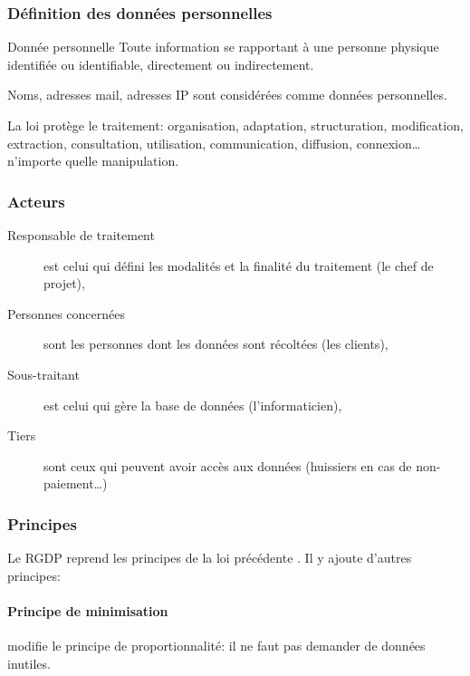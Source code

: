 \documentclass[10pt,a4paper,french]{article}
\begin{document}
\subsubsection{Définition des données personnelles}

\begin{cquote}{Donnée personnelle}
Toute information se rapportant à une personne physique identifiée ou identifiable, directement ou indirectement.
\end{cquote}

Noms, adresses mail, adresses IP sont considérées comme données personnelles.

La loi protège le traitement: organisation, adaptation, structuration, modification, extraction, consultation, utilisation, communication, diffusion, connexion\ldots n'importe quelle manipulation.

\subsubsection{Acteurs}

\begin{description}
\item[Responsable de traitement] est celui qui défini les modalités et la finalité du traitement (le chef de projet),
\item[Personnes concernées] sont les personnes dont les données sont récoltées (les clients),
\item[Sous-traitant] est celui qui gère la base de données (l'informaticien),
\item[Tiers] sont ceux qui peuvent avoir accès aux données (huissiers en cas de non-paiement\ldots)
\end{description}

\subsubsection{Principes}

Le RGDP reprend les principes de la loi précédente . Il y ajoute d'autres principes:

\paragraph{Principe de minimisation}
modifie le principe de proportionnalité: il ne faut pas demander de données inutiles.
\end{document}
